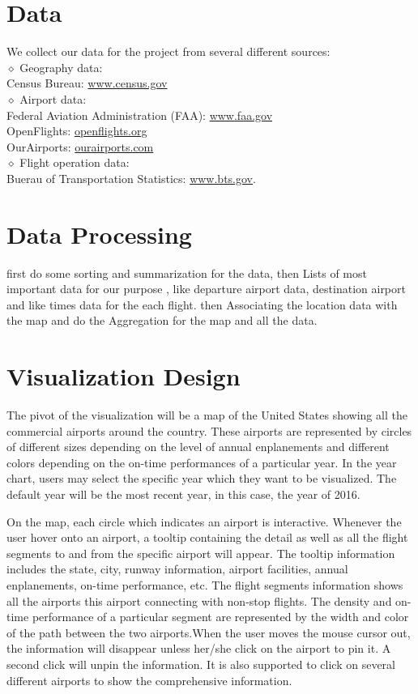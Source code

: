 \documentclass[12pt]{article}
\begin{document}
\section{Data}
    \noindent We collect our data for the project from several different sources:\\
    $\diamond$ Geography data:\\
    \indent Census Bureau: \url{www.census.gov}\\
    $\diamond$ Airport data:\\
    \indent Federal Aviation Administration (FAA): \url{www.faa.gov}\\
    \indent OpenFlights: \url{openflights.org}\\
    \indent OurAirports: \url{ourairports.com}\\
    $\diamond$ Flight operation data:\\
    \indent Buerau of Transportation Statistics: \url{www.bts.gov}.

\section{Data Processing}
    first do some sorting and summarization for the data, then Lists of most important data for our purpose , like departure airport data, destination airport and  like times data for the each flight.  then Associating the location data with the map and do the Aggregation for the map and all the data.

\section{Visualization Design}

The pivot of the visualization will be a map of the United States showing all the commercial airports around the country. These airports are represented by circles of different sizes depending on the level of annual enplanements and different colors depending on the on-time performances of a particular year. In the year chart, users may select the specific year which they want to be visualized. The default year will be the most recent year, in this case, the year of 2016.

On the map, each circle which indicates an airport is interactive. Whenever the user hover onto an airport, a tooltip containing the detail as well as all the flight segments to and from the specific airport will appear. The tooltip information includes the state, city, runway information, airport facilities, annual enplanements, on-time performance, etc. The flight segments information shows all the airports this airport connecting with non-stop flights. The density and on-time performance of a particular segment are represented by the width and color of the path between the two airports.When the user moves the mouse cursor out, the information will disappear unless her/she click on the airport to pin it. A second click will unpin the information. It is also supported to click on several different airports to show the comprehensive information.
\end{document}
